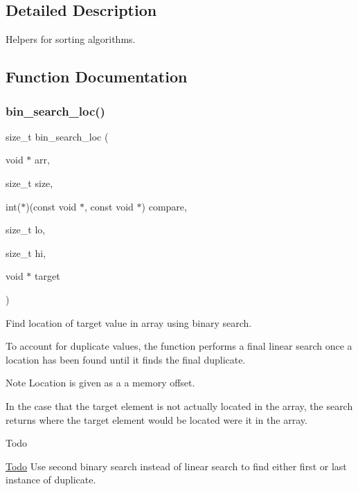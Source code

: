 \subsection{Detailed Description}
Helpers for sorting algorithms. 



\subsection{Function Documentation}
\mbox{\label{group__SortingHelper_ga347d3eac5748d59424afd8566181fc27}} 
\subsubsection{\texorpdfstring{bin\+\_\+search\+\_\+loc()}{bin\_search\_loc()}}
{\footnotesize\ttfamily size\+\_\+t bin\+\_\+search\+\_\+loc (\begin{DoxyParamCaption}\item[{void $\ast$}]{arr,  }\item[{size\+\_\+t}]{size,  }\item[{int($\ast$)(const void $\ast$, const void $\ast$)}]{compare,  }\item[{size\+\_\+t}]{lo,  }\item[{size\+\_\+t}]{hi,  }\item[{void $\ast$}]{target }\end{DoxyParamCaption})}



Find location of target value in array using binary search. 

To account for duplicate values, the function performs a final linear search once a location has been found until it finds the final duplicate.

\begin{DoxyNote}{Note}
Location is given as a a memory offset.

In the case that the target element is not actually located in the array, the search returns where the target element would be located were it in the array.
\end{DoxyNote}
\begin{DoxyRefDesc}{Todo}
\item[\hyperlink{todo__todo000002}{Todo}]Use second binary search instead of linear search to find either first or last instance of duplicate.\end{DoxyRefDesc}



